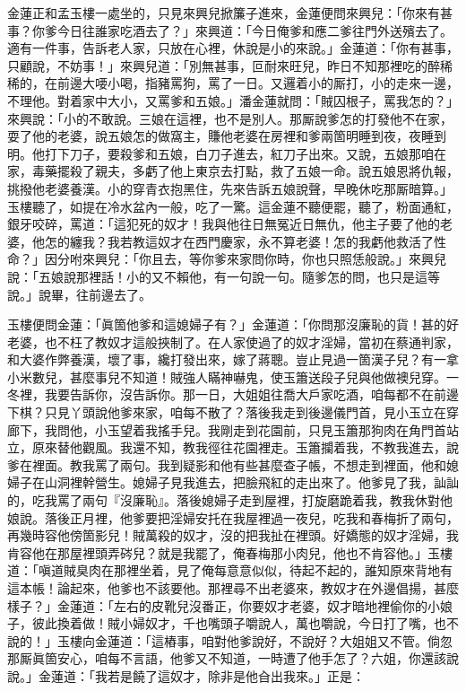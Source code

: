 金蓮正和孟玉樓一處坐的，只見來興兒掀簾子進來，金蓮便問來興兒：「你來有甚事？你爹今日往誰家吃酒去了？」來興道：「今日俺爹和應二爹往門外送殯去了。適有一件事，告訴老人家，只放在心裡，休說是小的來說。」金蓮道：「你有甚事，只顧說，不妨事！」來興兒道：「別無甚事，叵耐來旺兒，昨日不知那裡吃的醉稀稀的，在前邊大喓小喝，指豬罵狗，罵了一日。又邏着小的厮打，小的走來一邊，不理他。對着家中大小，又罵爹和五娘。」潘金蓮就問：「賊囚根子，罵我怎的？」來興說：「小的不敢說。三娘在這裡，也不是別人。那厮說爹怎的打發他不在家，耍了他的老婆，說五娘怎的做窩主，賺他老婆在房裡和爹兩箇明睡到夜，夜睡到明。他打下刀子，要殺爹和五娘，白刀子進去，紅刀子出來。又說，五娘那咱在家，毒藥擺殺了親夫，多虧了他上東京去打點，救了五娘一命。說五娘恩將仇報，挑撥他老婆養漢。小的穿青衣抱黑住，先來告訴五娘說聲，早晚休吃那厮暗算。」玉樓聽了，如提在冷水盆內一般，吃了一驚。這金蓮不聽便罷，聽了，粉面通紅，銀牙咬碎，罵道：「這犯死的奴才！我與他往日無冤近日無仇，他主子要了他的老婆，他怎的纏我？我若教這奴才在西門慶家，永不算老婆！怎的我虧他救活了性命？」因分咐來興兒：「你且去，等你爹來家問你時，你也只照恁般說。」來興兒說：「五娘說那裡話！小的又不賴他，有一句說一句。隨爹怎的問，也只是這等說。」{}說畢，往前邊去了。

玉樓便問金蓮：「眞箇他爹和這媳婦子有？」{}金蓮道：「你問那沒廉恥的貨！甚的好老婆，也不枉了教奴才這般挾制了。在人家使過了的奴才淫婦，當初在蔡通判家，和大婆作弊養漢，壞了事，纔打發出來，嫁了蔣聰。{}豈止見過一箇漢子兒？有一拿小米數兒，甚麼事兒不知道！賊強人瞞神嚇鬼，使玉簫送段子兒與他做襖兒穿。一冬裡，我要告訴你，沒告訴你。那一日，大姐姐往喬大戶家吃酒，咱每都不在前邊下棋？只見丫頭說他爹來家，咱每不散了？落後我走到後邊儀門首，見小玉立在穿廊下，我問他，小玉望着我搖手兒。我剛走到花園前，只見玉簫那狗肉在角門首站立，原來替他觀風。我還不知，教我徑往花園裡走。玉簫攔着我，不教我進去，說爹在裡面。教我罵了兩句。我到疑影和他有些甚麼查子帳，不想走到裡面，他和媳婦子在山洞裡幹營生。{}媳婦子見我進去，把臉飛紅的走出來了。他爹見了我，訕訕的，吃我罵了兩句『沒廉恥』。落後媳婦子走到屋裡，打旋磨跪着我，教我休對他娘說。落後正月裡，他爹要把淫婦安托在我屋裡過一夜兒，吃我和春梅折了兩句，再幾時容他傍箇影兒！賊萬殺的奴才，沒的把我扯在裡頭。好嬌態的奴才淫婦，我肯容他在那屋裡頭弄硶兒？就是我罷了，俺春梅那小肉兒，他也不肯容他。」玉樓道：「嗔道賊臭肉在那裡坐着，見了俺每意意似似，待起不起的，誰知原來背地有這本帳！{}論起來，他爹也不該要他。那裡尋不出老婆來，教奴才在外邊倡揚，甚麼樣子？」金蓮道：「左右的皮靴兒沒番正，你要奴才老婆，奴才暗地裡偷你的小娘子，彼此換着做！賊小婦奴才，千也嘴頭子嚼說人，萬也嚼說，今日打了嘴，也不說的！」{}玉樓向金蓮道：「這樁事，咱對他爹說好，不說好？大姐姐又不管。倘忽那厮眞箇安心，咱每不言語，他爹又不知道，一時遭了他手怎了？六姐，你還該說說。」金蓮道：「我若是饒了這奴才，除非是他㒲出我來。」正是：

